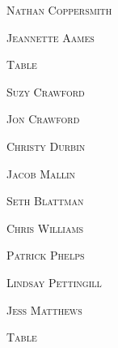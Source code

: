 \documentclass[12pt]{article}
\begin{document}
\vspace*{.15in}
\textsc{\Huge Nathan Coppersmith}

\vspace*{.15in}
\textsc{\Huge Jeannette Aames}

\vspace*{\fill}

\newpage

\vspace*{.25in}

\textsc{\Huge Table}
\vspace*{.3in}


\vspace*{\fill}

\textsc{\Huge Suzy Crawford}

\vspace*{.15in}
\textsc{\Huge Jon Crawford}

\vspace*{.15in}
\textsc{\Huge Christy Durbin}

\vspace*{.15in}
\textsc{\Huge Jacob Mallin}

\vspace*{.15in}
\textsc{\Huge Seth Blattman}

\vspace*{.15in}
\textsc{\Huge Chris Williams}

\vspace*{.15in}
\textsc{\Huge Patrick Phelps}

\vspace*{.15in}
\textsc{\Huge Lindsay Pettingill}

\vspace*{.15in}
\textsc{\Huge Jess Matthews}

\vspace*{\fill}

\newpage

\vspace*{.25in}

\textsc{\Huge Table}
\vspace*{.3in}


\vspace*{\fill}
\end{document}
